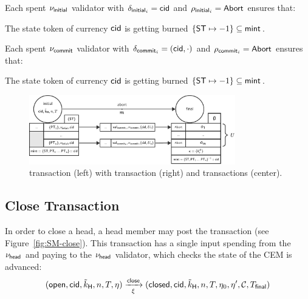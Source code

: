 \noindent Each spent $\nu_{\mathsf{initial}}$ validator with $\delta_{\mathsf{initial}_{i}} = \mathsf{cid}$ and $\rho_{\mathsf{initial}_{i}} = \mathsf{Abort}$ ensures that:
\begin{menumerate}
	\item The state token of currency $\mathsf{cid}$ is getting burned $\{\mathsf{ST} \mapsto -1\} \subseteq \mathsf{mint}$.
\end{menumerate}

\noindent Each spent $\nu_{\mathsf{commit}}$ validator with $\delta_{\mathsf{commit}_{i}} = (\mathsf{cid},\cdot)$ and $\rho_{\mathsf{commit}_{i}} = \mathsf{Abort}$ ensures that:
\begin{menumerate}
	\item The state token of currency $\mathsf{cid}$ is getting burned $\{\mathsf{ST} \mapsto -1\} \subseteq \mathsf{mint}$.
\end{menumerate}

\begin{figure}[h]
	\centering
	\includegraphics[width=0.8\textwidth]{figures/SM-abort.pdf}
	\caption{\mtxInit{} transaction (left) with \mtxAbort{} transaction (right)
		and \mtxCom{} transactions (center).}\label{fig:SM-abort}
\end{figure}

\subsection{Close Transaction}\label{sec:close-tx}

In order to close a head, a head member may post the \mtxClose{} transaction
(see Figure~\ref{fig:SM-close}). This transaction has a single input
spending from the $\nu_\mathsf{head}$ and paying to the $\nu_\mathsf{head}$ validator, which checks
the state of the CEM is advanced:
\[
	(\mathsf{open},\mathsf{cid},\tilde{k}_{\mathsf{H}},n,T,\eta) \xrightarrow[\xi]{\mathsf{close}} (\mathsf{closed},\mathsf{cid},\tilde{k}_{\mathsf{H}},n,T,\eta_0,\eta',\mathcal{C},T_{\mathsf{final}})
\]

